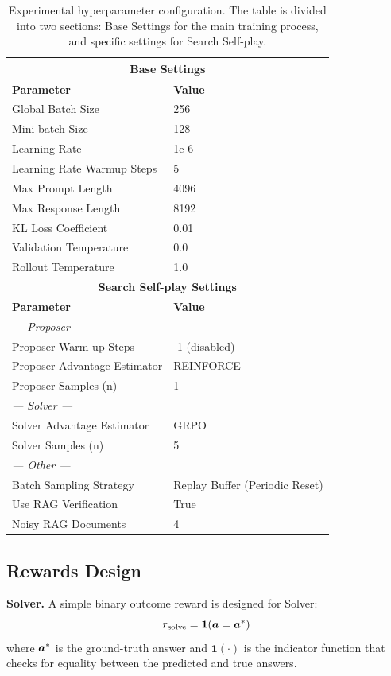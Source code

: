 \documentclass[10pt, a4paper, logo]{googledeepmind} %
\begin{document}
\begin{table}[htbp]
\centering
\caption{Experimental hyperparameter configuration. The table is divided into two sections: Base Settings for the main training process, and specific settings for Search Self-play.}
\label{tab:hyperparameter_settings_en}
\begin{tabular}{ll}
\toprule
\multicolumn{2}{c}{\textbf{Base Settings}} \\
\midrule
\textbf{Parameter} & \textbf{Value} \\
\midrule
Global Batch Size & 256 \\
Mini-batch Size & 128 \\
Learning Rate & 1e-6 \\
Learning Rate Warmup Steps & 5 \\
Max Prompt Length & 4096 \\
Max Response Length & 8192 \\
KL Loss Coefficient & 0.01 \\
Validation Temperature & 0.0 \\
Rollout Temperature & 1.0 \\
\midrule
\multicolumn{2}{c}{\textbf{Search Self-play Settings}} \\
\midrule
\textbf{Parameter} & \textbf{Value} \\
\textit{--- Proposer ---} & \\
Proposer Warm-up Steps & -1 (disabled) \\
Proposer Advantage Estimator & REINFORCE \\
Proposer Samples (n) & 1 \\
\textit{--- Solver ---} & \\
Solver Advantage Estimator & GRPO \\
Solver Samples (n) & 5 \\
\textit{--- Other ---} & \\
Batch Sampling Strategy & Replay Buffer (Periodic Reset) \\
Use RAG Verification & True \\
Noisy RAG Documents & 4 \\
\bottomrule
\end{tabular}
\end{table}

\subsection{Rewards Design}

\textbf{Solver.} A simple binary outcome reward is designed for Solver:
\begin{equation}
r_{\text{solve}} = \bm{1}({\bm{a}} = {\bm{a}}^*)
\end{equation}
where ${\bm{a}}^*$ is the ground-truth answer and $\bm{1}(\cdot)$ is the indicator function that checks for equality between the predicted and true answers. 
\end{document}
